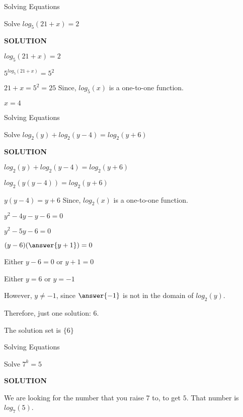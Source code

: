 \documentclass{ximera}
\begin{document}
\begin{example} Solving Equations


Solve $log_5(21 + x) = 2$


\textbf{\textcolor{purple!50!blue!90!black}{SOLUTION}}


$log_5(21 + x) = 2$

$5^{log_5(21 + x)} = 5^2$

$21 + x = 5^2 = 25$    Since, $log_5(x)$ is a one-to-one function.

$x = 4$

\end{example}










\begin{example} Solving Equations


Solve $log_2(y) + log_2(y-4) = log_2(y+6)$


\textbf{\textcolor{purple!50!blue!90!black}{SOLUTION}}


$log_2(y) + log_2(y-4) = log_2(y+6)$

$log_2(y(y-4)) = log_2(y+6)$

$y(y-4) = y+6$    Since, $log_2(x)$ is a one-to-one function.

$y^2 - 4y - y - 6 = 0$

$y^2 - 5y - 6 = 0$

$(y-6)(\answer{y+1}) = 0$


Either $y-6 = 0$ or $y+1 = 0$

Either $y = 6$ or $y = -1$

However, $y \ne -1$, since $\answer{-1}$ is not in the domain of $log_2(y)$.

Therefore, just one solution: $6$.

The solution set is $\{ 6 \}$

\end{example}






\begin{example} Solving Equations


Solve $7^k = 5$


\textbf{\textcolor{purple!50!blue!90!black}{SOLUTION}}


We are looking for the number that you raise $7$ to, to get $5$.  That number  is $log_7(5)$.

\end{example}
\end{document}
